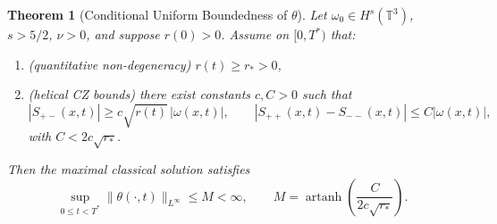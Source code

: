 \documentclass[12pt,a4paper]{article}
\newtheorem{theorem}{Theorem}[section]
\theoremstyle{definition}
\newcommand{\artanh}{\operatorname{artanh}}
\newcommand{\T}{\mathbb{T}}
\newcommand{\norm}[1]{\lVert #1 \rVert}
\begin{document}
\begin{theorem}[Conditional Uniform Boundedness of $\theta$]\label{thm:theta_bound}
Let $\omega_0 \in H^s(\T^3)$, $s > 5/2$, $\nu > 0$, and suppose $r(0) > 0$. Assume on $[0,T^*)$ that:
\begin{enumerate}[label=(\roman*)]
  \item (quantitative non-degeneracy) $r(t) \geq r_* > 0$,
  \item (helical CZ bounds) there exist constants $c,C > 0$ such that
  \[
    |S_{+-}(x,t)| \geq c\sqrt{r(t)}\,|\omega(x,t)|, \qquad
    |S_{++}(x,t)-S_{--}(x,t)| \leq C|\omega(x,t)|,
  \]
  with $C < 2c\sqrt{r_*}$.
\end{enumerate}
Then the maximal classical solution satisfies
\begin{equation}
  \sup_{0 \leq t < T^*} \norm{\theta(\cdot,t)}_{L^\infty} \leq M < \infty, \qquad
  M = \artanh\!\left(\frac{C}{2c\sqrt{r_*}}\right).
\end{equation}
\end{theorem}
\end{document}

